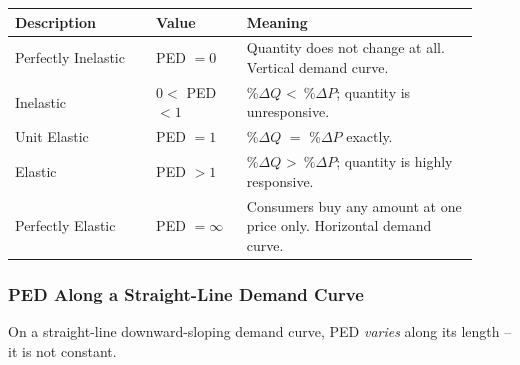 \documentclass[11pt, a4paper, twoside]{book}
\begin{document}
\begin{tcolorbox}[enhanced,colback=LightBlue,colframe=MidBlue!70,arc=0pt,boxrule=0.8pt]
\begin{tabular}{@{}>{\RaggedRight\arraybackslash}p{0.28\linewidth}>{\RaggedRight\arraybackslash}p{0.18\linewidth}>{\RaggedRight\arraybackslash}p{0.46\linewidth}@{}}
\textbf{\color{NavyPrimary}Description} & \textbf{\color{NavyPrimary}Value} & \textbf{\color{NavyPrimary}Meaning} \\
\midrule
Perfectly Inelastic & PED $= 0$ & Quantity does not change at all. Vertical demand curve. \\
Inelastic & $0 <$ PED $< 1$ & \%$\Delta Q$ \textless\ \%$\Delta P$; quantity is unresponsive. \\
Unit Elastic & PED $= 1$ & \%$\Delta Q$ $=$ \%$\Delta P$ exactly. \\
Elastic & PED $> 1$ & \%$\Delta Q$ \textgreater\ \%$\Delta P$; quantity is highly responsive. \\
Perfectly Elastic & PED $= \infty$ & Consumers buy any amount at one price only. Horizontal demand curve. \\
\end{tabular}
\end{tcolorbox}

\subsubsection{PED Along a Straight-Line Demand Curve}

On a straight-line downward-sloping demand curve, PED \emph{varies} along its length -- it is not constant.
\end{document}

